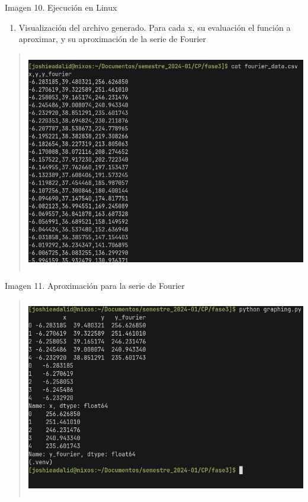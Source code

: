 Imagen 10. Ejecución en Linux

\begin{enumerate} \def\labelenumi{\arabic{enumi}.} \setcounter{enumi}{1} \item   Visualización del archivo generado. Para cada x, su evaluación el   función a aproximar, y su aproximación de la serie de Fourier \end{enumerate}

\begin{quote} \includegraphics[width=5.16146in,height=3.79822in]{media/image37.png} \end{quote}

Imagen 11. Aproximación para la serie de Fourier

\begin{quote} \includegraphics[width=5.16146in,height=3.42309in]{media/image25.png} \end{quote}

